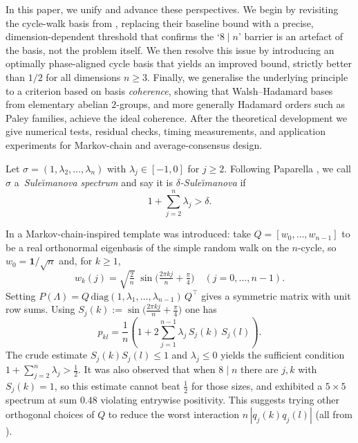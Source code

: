 \documentclass[12pt,fleqn]{amsart}
\renewcommand{\le}{\leqslant}
\renewcommand{\ge}{\geqslant}
\theoremstyle{definition}
\theoremstyle{remark}
\newcommand{\1}{\mathbf{1}}
\newcommand{\Lam}{\Lambda}
\begin{document}
In this paper, we unify and advance these perspectives. We begin by revisiting the cycle-walk basis from \cite{GK20}, replacing their baseline bound with a precise, dimension-dependent threshold that confirms the `$8 \mid n$' barrier is an artefact of the basis, not the problem itself. We then resolve this issue by introducing an optimally phase-aligned cycle basis that yields an improved bound, strictly better than $1/2$ for all dimensions $n \ge 3$. Finally, we generalise the underlying principle to a criterion based on basis \emph{coherence}, showing that Walsh--Hadamard bases from elementary abelian $2$-groups, and more generally Hadamard orders such as Paley families, achieve the ideal coherence.  After the theoretical development we give numerical tests, residual checks, timing measurements, and application experiments for Markov-chain and average-consensus design.\smallskip

Let $\sigma=(1,\lambda_2,\ldots,\lambda_n)$ with $\lambda_j\in[-1,0]$ for $j\ge 2$. Following Paparella \cite{Paparella16}, we call $\sigma$ a~\emph{Sule\u{\i}manova spectrum} and say it is \emph{$\delta$-Sule\u{\i}manova} if
\[
1+\sum_{j=2}^n\lambda_j>\delta .
\]

In \cite{GK20} a Markov-chain-inspired template was introduced: take $Q=[w_0,\ldots,w_{n-1}]$ to be a real orthonormal eigenbasis of the simple random walk on the $n$-cycle, so $w_0=\1/\sqrt n$ and, for $k\ge 1$,
\[
w_k(j)=\sqrt{\tfrac{2}{n}}\;\sin\!\Big(\tfrac{2\pi kj}{n}+\tfrac{\pi}{4}\Big)\quad (j=0,\ldots,n-1).
\]
Setting $P(\Lam)=Q\,\mathrm{diag}(1,\lambda_1,\ldots,\lambda_{n-1})\,Q^\top$ gives a symmetric matrix with unit row sums. Using $S_j(k):=\sin\!\big(\tfrac{2\pi kj}{n}+\tfrac{\pi}{4}\big)$ one has
\[
p_{kl}=\frac1n\!\left(1+2\sum_{j=1}^{n-1}\lambda_j\,S_j(k)\,S_j(l)\right).
\]
The crude estimate $S_j(k)S_j(l)\le 1$ and $\lambda_j\le 0$ yields the sufficient condition $1+\sum_{j=2}^n\lambda_j>\tfrac12$. It was also observed that when $8\mid n$ there are $j,k$ with $S_j(k)=1$, so this estimate cannot beat $\tfrac12$ for those sizes, and exhibited a $5\times 5$ spectrum at sum $0.48$ violating entrywise positivity. This suggests  trying other orthogonal choices of $Q$ to reduce the worst interaction $n\,|q_j(k)q_j(l)|$ (all from \cite{GK20}).
\end{document}

